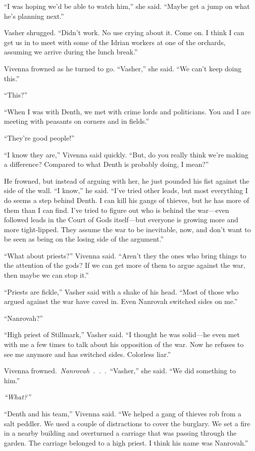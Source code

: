 “I was hoping we’d be able to watch him,” she said. “Maybe get a jump on what he’s planning next.”

Vasher shrugged. “Didn’t work. No use crying about it. Come on. I think I can get us in to meet with some of the Idrian workers at one of the orchards, assuming we arrive during the lunch break.”

Vivenna frowned as he turned to go. “Vasher,” she said. “We can’t keep doing this.”

“This?”

“When I was with Denth, we met with crime lords and politicians. You and I are meeting with peasants on corners and in fields.”

“They’re good people!”

“I know they are,” Vivenna said quickly. “But, do you really think we’re making a difference? Compared to what Denth is probably doing, I mean?”

He frowned, but instead of arguing with her, he just pounded his fist against the side of the wall. “I know,” he said. “I’ve tried other leads, but most everything I do seems a step behind Denth. I can kill his gangs of thieves, but he has more of them than I can find. I’ve tried to figure out who is behind the war—even followed leads in the Court of Gods itself—but everyone is growing more and more tight-lipped. They assume the war to be inevitable, now, and don’t want to be seen as being on the losing side of the argument.”

“What about priests?” Vivenna said. “Aren’t they the ones who bring things to the attention of the gods? If we can get more of them to argue against the war, then maybe we can stop it.”

“Priests are fickle,” Vasher said with a shake of his head. “Most of those who argued against the war have caved in. Even Nanrovah switched sides on me.”

“Nanrovah?”

“High priest of Stillmark,” Vasher said. “I thought he was solid—he even met with me a few times to talk about his opposition of the war. Now he refuses to see me anymore and has switched sides. Colorless liar.”

Vivenna frowned.~\textit{Nanrovah~.~.~.}~“Vasher,” she said. “We did something to him.”

\textit{“What?”}

“Denth and his team,” Vivenna said. “We helped a gang of thieves rob from a salt peddler. We used a couple of distractions to cover the burglary. We set a fire in a nearby building and overturned a carriage that was passing through the garden. The carriage belonged to a high priest. I think his name was Nanrovah.”

